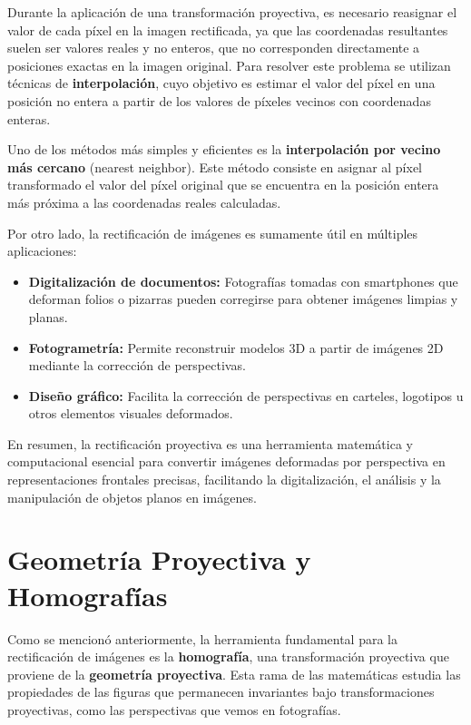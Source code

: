 Durante la aplicación de una transformación proyectiva, es necesario reasignar el valor de cada píxel en la imagen rectificada, ya que las coordenadas resultantes suelen ser valores reales y no enteros, que no corresponden directamente a posiciones exactas en la imagen original. Para resolver este problema se utilizan técnicas de \textbf{interpolación}, cuyo objetivo es estimar el valor del píxel en una posición no entera a partir de los valores de píxeles vecinos con coordenadas enteras.

Uno de los métodos más simples y eficientes es la \textbf{interpolación por vecino más cercano} (nearest neighbor). Este método consiste en asignar al píxel transformado el valor del píxel original que se encuentra en la posición entera más próxima a las coordenadas reales calculadas.

\label{sec:metodo_vecino}

\vspace{\baselineskip}

Por otro lado, la rectificación de imágenes es sumamente útil en múltiples aplicaciones:

\begin{itemize}
  \item \textbf{Digitalización de documentos:} Fotografías tomadas con smartphones que deforman folios o pizarras pueden corregirse para obtener imágenes limpias y planas.
  \item \textbf{Fotogrametría:} Permite reconstruir modelos 3D a partir de imágenes 2D mediante la corrección de perspectivas.
  \item \textbf{Diseño gráfico:} Facilita la corrección de perspectivas en carteles, logotipos u otros elementos visuales deformados.
\end{itemize}

En resumen, la rectificación proyectiva es una herramienta matemática y computacional esencial para convertir imágenes deformadas por perspectiva en representaciones frontales precisas, facilitando la digitalización, el análisis y la manipulación de objetos planos en imágenes.


\section{Geometría Proyectiva y Homografías}

Como se mencionó anteriormente, la herramienta fundamental para la rectificación de imágenes es la \textbf{homografía}, una transformación proyectiva que proviene de la \textbf{geometría proyectiva}. Esta rama de las matemáticas estudia las propiedades de las figuras que permanecen invariantes bajo transformaciones proyectivas, como las perspectivas que vemos en fotografías.

